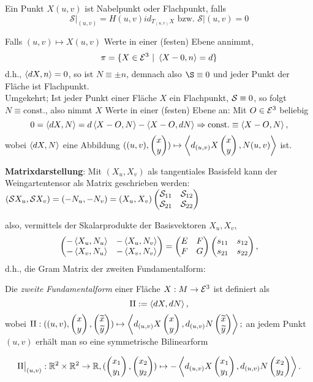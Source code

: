 \begin{remark}
	
	Ein Punkt $X(u,v)$ ist Nabelpunkt oder Flachpunkt, falls
	\[ \mathcal{S}\big|_{(u,v)} = H(u,v)id_{T_{(u,v)}X} \text{ bzw. } \mathcal{S}\big|{(u,v)}=0 \]
	
\end{remark}

\begin{example}
	
	Falls $  (u,v) \mapsto X(u,v) $ Werte in einer (festen) Ebene annimmt,
	\[ \pi = \{ X \in \mathcal E^3 ~|~ \left \langle X-0,n \right\rangle = d \} \] d.h., $ \left \langle dX,n \right\rangle=0 $, so ist $ N \equiv \pm n $, demnach also $\S \equiv 0$ und jeder Punkt der Fläche ist Flachpunkt.\\
	Umgekehrt; Ist jeder Punkt einer Fläche $ X $ ein Flachpunkt, $ \mathcal S \equiv 0 $, so folgt $ N \equiv \mathrm{const.} $, also nimmt $ X $ Werte in einer (festen) Ebene an: Mit $ O \in \mathcal E^3 $ beliebig \[ 0 = \left \langle dX,N \right\rangle = d\left \langle X-O,N \right\rangle - \left \langle X-O,dN \right\rangle \Rightarrow \mathrm{const.} \equiv \left \langle X-O,N \right\rangle, \] wobei $ \left \langle dX,N \right\rangle $ eine Abbildung $ ((u,v), \begin{pmatrix} x \\ y \end{pmatrix}) \mapsto \left \langle d_{(u,v)}X\begin{pmatrix} x\\y \end{pmatrix},N(u,v) \right\rangle $ ist.

	\textbf{Matrixdarstellung}: Mit $(X_u,X_v)$ als tangentiales Basisfeld kann der Weingartentensor als Matrix geschrieben werden:
	$ (\mathcal S X_u, \mathcal S X_v) = (-N_u, -N_v) = (X_u,X_v) \begin{pmatrix} \mathcal S_{11} & \mathcal S_{12} \\ \mathcal S_{21} & \mathcal S_{22} \end{pmatrix} $
	
	also, vermittels der Skalarprodukte der Basisvektoren $ X_u,X_v $, 
	\[\begin{pmatrix} -\left \langle X_u,N_u \right\rangle & - \left \langle X_u,N_v \right\rangle \\ - \left \langle X_v,N_u \right\rangle & - \left \langle X_v,N_v \right\rangle  \end{pmatrix} = \begin{pmatrix} E &F \\ F &G \end{pmatrix} \begin{pmatrix} s_{11} & s_{12} \\ s_{21} & s_{22} \end{pmatrix}, \] d.h., die Gram Matrix der zweiten Fundamentalform:
	
\end{example}

\begin{lemma, definition}
	 Die \emph{zweite Fundamentalform} einer Fläche $ X: M \rightarrow \mathcal E^3 $ ist definiert als \[ \mathrm{II} := \left \langle dX,dN \right\rangle, \] wobei $ \mathrm{II}: ((u,v), \begin{pmatrix} x \\ y \end{pmatrix},\begin{pmatrix} \widetilde{x} \\ \widetilde{y} \end{pmatrix}) \mapsto \left \langle d_{(u,v)}X \begin{pmatrix} x\\y \end{pmatrix},d_{(u,v)}N \begin{pmatrix} \widetilde{x}\\\widetilde{y} \end{pmatrix} \right\rangle; $
	 an jedem Punkt $ (u,v) $ erhält man so eine symmetrische Bilinearform 
	 
	 \[ \mathrm{II}\big|_{(u,v)}: \mathbb R^2 \times \mathbb R^2 \rightarrow \mathbb R, (\begin{pmatrix} x_1 \\ y_1 \end{pmatrix},\begin{pmatrix} x_2 \\ y_2 \end{pmatrix}) \mapsto - \left \langle d_{(u,v)}X\begin{pmatrix} x_1 \\ y_1 \end{pmatrix},d_{(u,v)}N\begin{pmatrix} x_2 \\ y_2 \end{pmatrix} \right\rangle. \]
	 
\end{lemma, definition}


